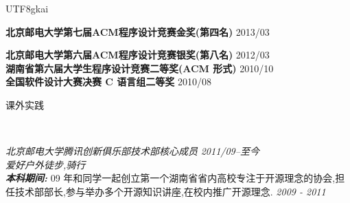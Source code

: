 \documentclass[9pt]{article}
\newenvironment{changemargin}[2]{%
  \begin{list}{}{%
    \setlength{\topsep}{0pt}%
    \setlength{\leftmargin}{#1}%
    \setlength{\rightmargin}{#2}%
    \setlength{\listparindent}{\parindent}%
    \setlength{\itemindent}{\parindent}%
    \setlength{\parsep}{\parskip}%
  }%
  \item[]}{\end{list}
}
\newcommand{\lineover}{
	\begin{changemargin}{-0.05in}{-0.05in}
		\vspace*{-8pt}
		\hrulefill \\
		\vspace*{-2pt}
	\end{changemargin}
}
\newcommand{\header}[1]{
	\begin{changemargin}{-0.5in}{-0.5in}
		\scshape{#1}\\
  	\lineover
	\end{changemargin}
}
\newenvironment{body} {
	\vspace*{-16pt}
	\begin{changemargin}{-0.25in}{-0.5in}
  }	
	{\end{changemargin}
}
\begin{document}
\begin{CJK}{UTF8}{gkai}
\begin{body}
	\vspace{14pt}
	\textbf {北京邮电大学第七届ACM程序设计竞赛金奖(第四名)}  \hfill  {2013/03} \\
	\smallskip

	\textbf {北京邮电大学第六届ACM程序设计竞赛银奖(第八名)}  \hfill  {2012/03} \\

	\smallskip
	\textbf {湖南省第六届大学生程序设计竞赛二等奖(ACM 形式)}   \hfill  {2010/10}\\
	
	\smallskip
	\textbf{全国软件设计大赛决赛 C 语言组二等奖 } \hfill  {2010/08} \\
\end{body}



\smallskip


\header{课外实践}

\begin{body}
	\vspace{14pt}
	\emph {北京邮电大学腾讯创新俱乐部技术部核心成员} \hfill {} \emph{2011/09--至今}\\
	\emph {爱好户外徒步,骑行} \hfill {} \\

	\smallskip
	\emph {\textbf{本科期间:}}{} {09 年和同学一起创立第一个湖南省省内高校专注于开源理念的协会,担任技术部部长,参与举办多个开源知识讲座,在校内推广开源理念.} \hfill{} \emph{2009 - 2011}\\

\end{body}

\smallskip
\end{CJK}
\end{document}
